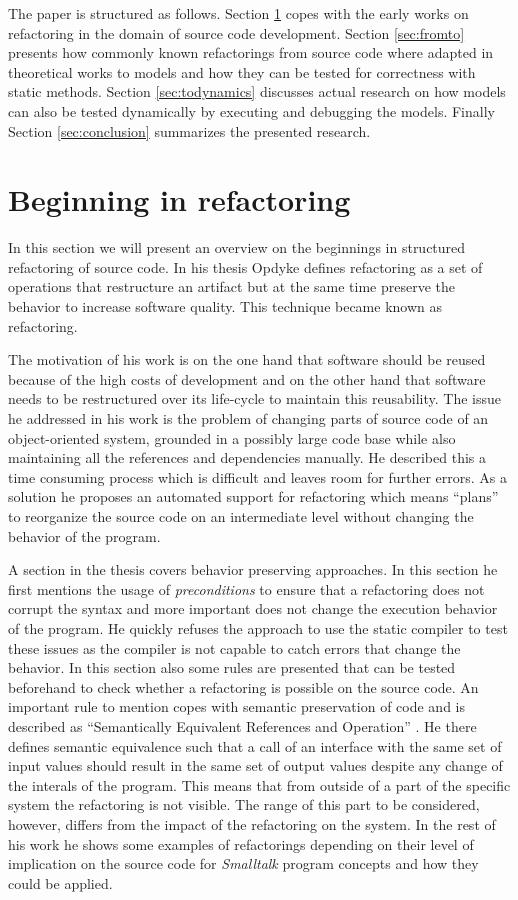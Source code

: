 \documentclass{llncs}
\begin{document}
The paper is structured as follows. Section \ref{sec:beginning} copes with the early works on refactoring in the domain
of source code development. Section \ref{sec:fromto} presents how commonly known refactorings from source code where
adapted in theoretical works to models and how they can be tested for correctness with static methods. Section 
\ref{sec:todynamics} discusses actual research on how models can also be tested dynamically by executing and debugging 
the models. Finally Section \ref{sec:conclusion} summarizes the presented research.

\section{Beginning in refactoring}
\label{sec:beginning}

In this section we will present an overview on the beginnings in structured refactoring of source code. In his thesis
Opdyke \cite{mast:REFOOF} defines refactoring as a set of operations that restructure an artifact but at the same time
preserve the behavior to increase software quality. This technique became known as refactoring.

The motivation of his work is on the one hand that software should be reused because of the high costs of development
and on the other hand that software needs to be restructured over its life-cycle to maintain this reusability. The issue
he addressed in his work is the problem of changing parts of source code of an object-oriented system, grounded in a
possibly large code base while also maintaining all the references and dependencies manually. He described this a time
consuming process which is difficult and leaves room for further errors. As a solution he proposes an automated support
for refactoring which means ``plans'' to reorganize the source code on an intermediate level without changing the behavior
of the program.

A section in the thesis covers behavior preserving approaches. In this section he first mentions the usage of
\textit{preconditions} to ensure that a refactoring does not corrupt the syntax and more important does not change the
execution behavior of the program. He quickly refuses the approach to use the static compiler to test these issues as
the compiler is not capable to catch errors that change the behavior. In this section also some rules are presented that
can be tested beforehand to check whether a refactoring is possible on the source code. An important rule to mention copes with
semantic preservation of code and is described as ``Semantically Equivalent References and Operation'' \cite{mast:REFOOF}. He there defines
semantic equivalence such that a call of an interface with the same set of input values should result in the same set of
output values despite any change of the interals of the program. This means that from outside of a part of the specific system
the refactoring is not visible. The range of this part to be considered, however, differs from the impact of the refactoring on
the system. In the rest of his work he shows some examples of refactorings depending on their level of implication on
the source code for \textit{Smalltalk} program concepts and how they could be applied.
\end{document}
